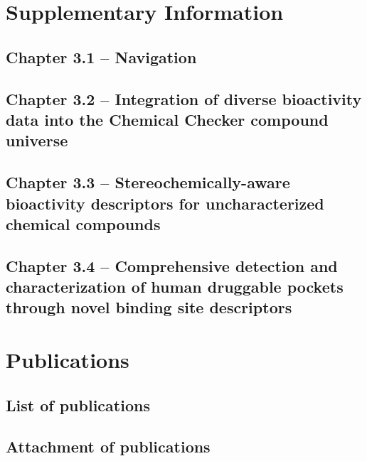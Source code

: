 \titleformat{\section}[block]
  {\normalfont\LARGE\bfseries}{\thesection}{1em}{}


\chapter{Supplementary Information}
\newpage

\section{Chapter 3.1 -- Navigation}

\clearpage
\section{Chapter 3.2 -- Integration of diverse bioactivity data into the Chemical Checker compound universe}


\clearpage
\section{Chapter 3.3 -- Stereochemically-aware bioactivity descriptors for uncharacterized chemical compounds}


\clearpage
\section{Chapter 3.4 -- Comprehensive detection and characterization of human druggable pockets through novel binding site descriptors}




\chapter{Publications}
\newpage
\section{List of publications}
\section{Attachment of publications}

